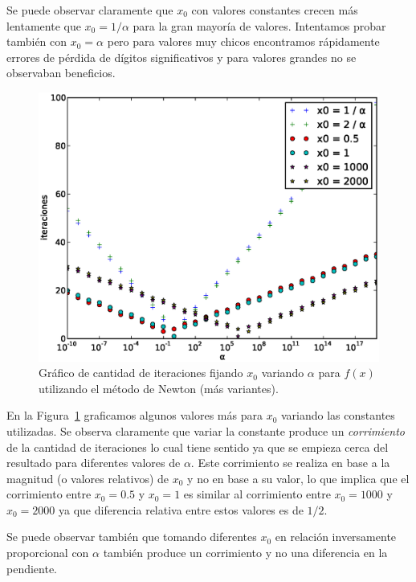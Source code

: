 Se puede observar claramente que $x_0$ con valores constantes crecen más
lentamente que $x_0 = 1 / \alpha$ para la gran mayoría de valores. Intentamos
probar también con $x_0 = \alpha$ pero para valores muy chicos encontramos
rápidamente errores de pérdida de dígitos significativos y para valores grandes
no se observaban beneficios.

\begin{figure}[!htbp]
  \begin{center}
    \includegraphics[scale=0.5]{graficos/new/f_newton_x0_fijo_2.eps}
    \caption{\label{fig:f_newton_x0_fijo_2} Gráfico de cantidad de iteraciones fijando $x_0$ variando $\alpha$ para $f(x)$ utilizando el método de Newton (más variantes).}
  \end{center}
\end{figure}

En la Figura~\ref{fig:f_newton_x0_fijo_2} graficamos algunos valores más para
$x_0$ variando las constantes utilizadas. Se observa claramente que variar la
constante produce un \emph{corrimiento} de la cantidad de iteraciones lo cual
tiene sentido ya que se empieza cerca del resultado para diferentes valores de
$\alpha$. Este corrimiento se realiza en base a la magnitud (o valores relativos)
de $x_0$ y no en base a su valor, lo que implica que el corrimiento entre $x_0
= 0.5$ y $x_0 = 1$ es similar al corrimiento entre $x_0 = 1000$ y $x_0 = 2000$
ya que diferencia relativa entre estos valores es de $1/2$.

Se puede observar también que tomando diferentes $x_0$ en relación inversamente
proporcional con $\alpha$ también produce un corrimiento y no una diferencia en
la pendiente.

